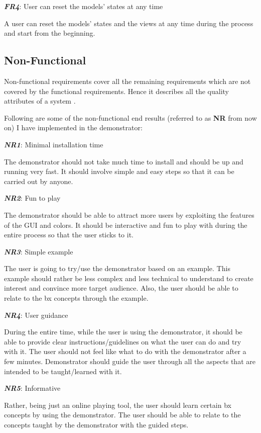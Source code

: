 \textbf{\textit{FR4}}: User can reset the models' states at any time

A user can reset the models' states and the views at any time during the process and start from the beginning.

\subsection{Non-Functional}\label{subsec:nonfunctionalreq}
Non-functional requirements cover all the remaining requirements which are not covered by the functional requirements. Hence it describes all the quality attributes of a system \cite{funcandnonfuncreq}.

Following are some of the non-functional end results (referred to as \textbf{NR} from now on) I have implemented in the demonstrator:

\textbf{\textit{NR1}}: Minimal installation time

The demonstrator should not take much time to install and should be up and running very fast. It should involve simple and easy steps so that it can be carried out by anyone.

\textbf{\textit{NR2}}: Fun to play

The demonstrator should be able to attract more users by exploiting the features of the GUI and colors. It should be interactive and fun to play with during the entire process so that the user sticks to it.

\textbf{\textit{NR3}}: Simple example

The user is going to try/use the demonstrator based on an example. This example should rather be less complex and less technical to understand to create interest and convince more target audience. Also, the user should be able to relate to the bx concepts through the example.

\textbf{\textit{NR4}}: User guidance

During the entire time, while the user is using the demonstrator, it should be able to provide clear instructions/guidelines on what the user can do and try with it. The user should not feel like what to do with the demonstrator after a few minutes. Demonstrator should guide the user through all the aspects that are intended to be taught/learned with it.

\textbf{\textit{NR5}}: Informative

Rather, being just an online playing tool, the user should learn certain bx concepts by using the demonstrator. The user should be able to relate to the concepts taught by the demonstrator with the guided steps.

